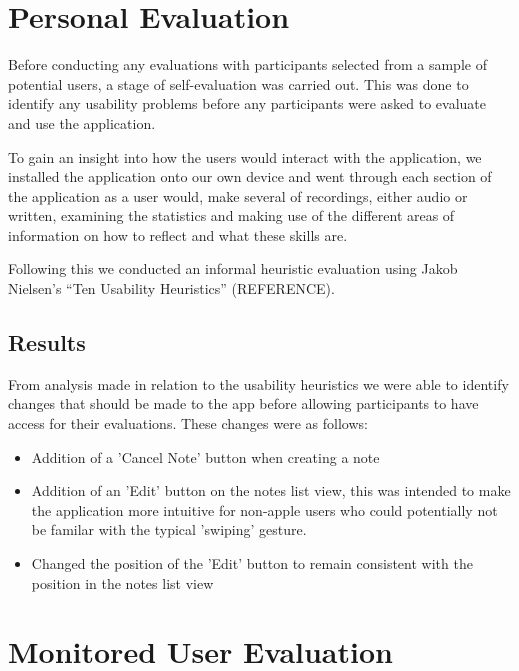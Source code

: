 \documentclass{l4proj}
\begin{document}
\section{Personal Evaluation}
Before conducting any evaluations with participants selected from a sample of potential users, a stage of self-evaluation
was carried out. This was done to identify any usability problems before any participants were asked to evaluate and use 
the application. 
\par 
To gain an insight into how the users would interact with the application, we installed the application onto our own device
and went through each section of the application as a user would, make several of recordings, either audio or written, 
examining the statistics and making use of the different areas of information on how to reflect and what these skills are.
\par 
Following this we conducted an informal heuristic evaluation using Jakob Nielsen’s “Ten Usability Heuristics” (REFERENCE). 

\subsection{Results}
From analysis made in relation to the usability heuristics we were able to identify changes that should 
be made to the app before allowing participants to have access for their evaluations. 
These changes were as follows:
\begin{itemize}
    \item Addition of a 'Cancel Note' button when creating a note
    \item Addition of an 'Edit' button on the notes list view, this was intended to make the application more intuitive
    for non-apple users who could potentially not be familar with the typical 'swiping' gesture.
    \item Changed the position of the 'Edit' button to remain consistent with the position in the notes list view
\end{itemize}

\section{Monitored User Evaluation}
\end{document}
